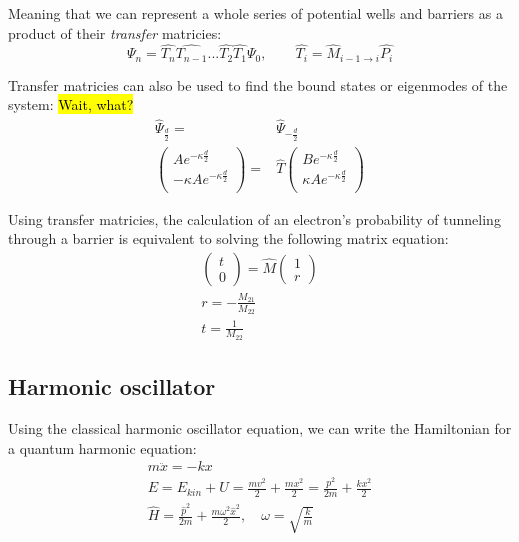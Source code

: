 			Meaning that we can represent a whole series of potential wells and barriers as a product of their \textit{transfer} matricies:
			\begin{equation}
				\Psi_n = \hat{T_n}\hat{T_{n-1}}...\hat{T_2}\hat{T_1}\Psi_0, \qquad \hat{T_i} = \hat{M}_{i-1\rightarrow i}\hat{P_i} 
			\end{equation}
			
			Transfer matricies can also be used to find the bound states or eigenmodes of the system:
			\hl{Wait, what?}
			\begin{align}
				\hat{\Psi}_{\frac{d}{2}} =& \hat{\Psi}_{-\frac{d}{2}} \\
				\begin{pmatrix}
					Ae^{-\kappa \frac{d}{2}} \\
					-\kappa Ae^{-\kappa \frac{d}{2}} \\
				\end{pmatrix} =& \hat{T} 
				\begin{pmatrix}
					Be^{-\kappa \frac{d}{2}} \\
					\kappa Ae^{-\kappa \frac{d}{2}} \\
				\end{pmatrix}
			\end{align}
			
			Using transfer matricies, the calculation of an electron's probability of tunneling through a barrier is equivalent to solving the following matrix equation:
			\begin{align}
				\begin{pmatrix}
					t \\
					0
				\end{pmatrix} = \hat{M}
				\begin{pmatrix}
					1 \\
					r
				\end{pmatrix} \\
				r  = -\frac{M_{21}}{M_{22}} \\
				t = \frac{1}{M_{22}}
			\end{align}
	\subsection{Harmonic oscillator}
		\label{sec:harmonic}
	
		Using the classical harmonic oscillator equation, we can write the Hamiltonian for a quantum harmonic equation:
		\begin{align}
			m\ddot{x} = -kx \\
			E = E_{kin} + U = \frac{mv^2}{2} + \frac{mx^2}{2} = \frac{p^2}{2m} + \frac{kx^2}{2} \\
			\hat{H} = \frac{\hat{p}^2}{2m} + \frac{m\omega^2\hat{x}^2}{2}, \quad \omega = \sqrt{\frac{k}{m}}
		\end{align}
		
